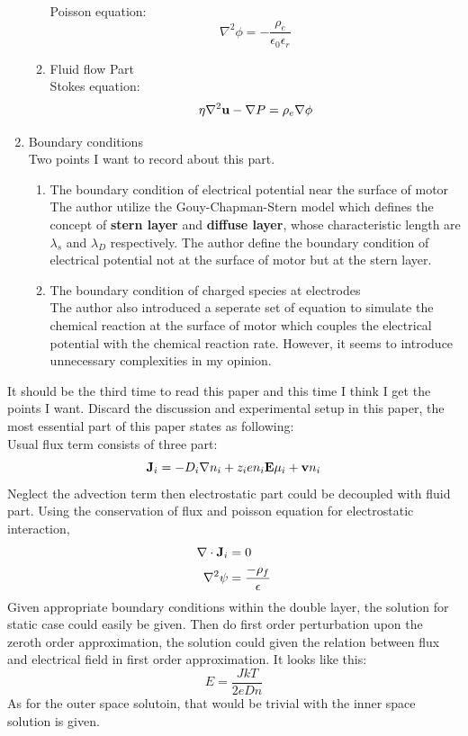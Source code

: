 \documentclass[fontsize=11pt, %
                             paper=a4, %
                             twoside, %
                             captions=tableheading,
                             index=totoc,
                             hyperref]{labbook}
\begin{document}
\begin{addmargin}[4cm]{0cm}
\begin{enumerate}
\begin{enumerate}
Poisson equation:
\begin{equation}
\nabla^2\phi=-\frac{\rho_e}{\epsilon_0\epsilon_r}
\end{equation}
\item Fluid flow Part\\
Stokes equation:
\begin{equation}
\eta \nabla^2\mathbf{u} -\nabla P=\rho_e \nabla \phi
\end{equation}
\end{enumerate}
\item Boundary conditions\\
Two points I want to record about this part. 
\begin{enumerate}
\item
The boundary condition of electrical potential near the surface of motor\\
The author utilize the Gouy-Chapman-Stern model which defines the concept of \textbf{stern layer} and \textbf{diffuse layer}, whose characteristic length are $\lambda_s$ and $\lambda_D$ respectively. The author define the boundary condition of electrical potential not at the surface of motor but at the stern layer.
\item
The boundary condition of charged species at electrodes\\
The author also introduced a seperate set of equation to simulate the chemical reaction at the surface of motor which couples the electrical potential with the chemical reaction rate. However, it seems to introduce unnecessary complexities in my opinion.
\end{enumerate}
\end{enumerate}
It should be the third time to read this paper and this time I think I get the points I want. Discard the discussion and experimental setup in this paper, the most essential part of this paper states as following:\\
Usual flux term consists of three part:
\begin{equation}
\mathbf{J}_i=-D_i \nabla n_i +z_i e n_i \mathbf{E} \mu_i + \mathbf{v} n_i
\end{equation}
Neglect the advection term then electrostatic part could be decoupled with fluid part. Using the conservation of flux and poisson equation for electrostatic interaction, 
\begin{equation}
\begin{aligned}
\nabla \cdot \mathbf{J}_i &=0\\
\nabla^2 \psi &= \frac{-\rho_f}{\epsilon}
\end{aligned}
\end{equation}
Given appropriate boundary conditions within the double layer, the solution for static case could easily be given. Then do first order perturbation upon the zeroth order approximation, the solution could given the relation between flux and electrical field in first order approximation. It looks like this:
\begin{equation}
E=\frac{J kT}{2eDn}
\end{equation}
As for the outer space solutoin, that would be trivial with the inner space solution is given.


\end{addmargin}
\end{document}

